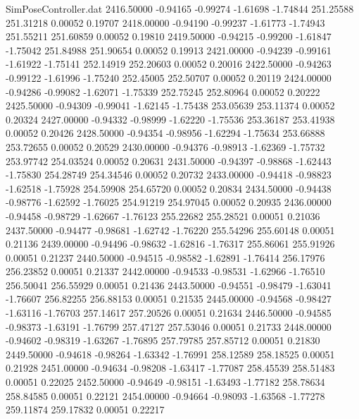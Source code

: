 \begin{filecontents}{SimPoseController.dat}
2416.50000   -0.94165   -0.99274    -1.61698   -1.74844  251.25588  251.31218    0.00052    0.19707
2418.00000   -0.94190   -0.99237    -1.61773   -1.74943  251.55211  251.60859    0.00052    0.19810
2419.50000   -0.94215   -0.99200    -1.61847   -1.75042  251.84988  251.90654    0.00052    0.19913
2421.00000   -0.94239   -0.99161    -1.61922   -1.75141  252.14919  252.20603    0.00052    0.20016
2422.50000   -0.94263   -0.99122    -1.61996   -1.75240  252.45005  252.50707    0.00052    0.20119
2424.00000   -0.94286   -0.99082    -1.62071   -1.75339  252.75245  252.80964    0.00052    0.20222
2425.50000   -0.94309   -0.99041    -1.62145   -1.75438  253.05639  253.11374    0.00052    0.20324
2427.00000   -0.94332   -0.98999    -1.62220   -1.75536  253.36187  253.41938    0.00052    0.20426
2428.50000   -0.94354   -0.98956    -1.62294   -1.75634  253.66888  253.72655    0.00052    0.20529
2430.00000   -0.94376   -0.98913    -1.62369   -1.75732  253.97742  254.03524    0.00052    0.20631
2431.50000   -0.94397   -0.98868    -1.62443   -1.75830  254.28749  254.34546    0.00052    0.20732
2433.00000   -0.94418   -0.98823    -1.62518   -1.75928  254.59908  254.65720    0.00052    0.20834
2434.50000   -0.94438   -0.98776    -1.62592   -1.76025  254.91219  254.97045    0.00052    0.20935
2436.00000   -0.94458   -0.98729    -1.62667   -1.76123  255.22682  255.28521    0.00051    0.21036
2437.50000   -0.94477   -0.98681    -1.62742   -1.76220  255.54296  255.60148    0.00051    0.21136
2439.00000   -0.94496   -0.98632    -1.62816   -1.76317  255.86061  255.91926    0.00051    0.21237
2440.50000   -0.94515   -0.98582    -1.62891   -1.76414  256.17976  256.23852    0.00051    0.21337
2442.00000   -0.94533   -0.98531    -1.62966   -1.76510  256.50041  256.55929    0.00051    0.21436
2443.50000   -0.94551   -0.98479    -1.63041   -1.76607  256.82255  256.88153    0.00051    0.21535
2445.00000   -0.94568   -0.98427    -1.63116   -1.76703  257.14617  257.20526    0.00051    0.21634
2446.50000   -0.94585   -0.98373    -1.63191   -1.76799  257.47127  257.53046    0.00051    0.21733
2448.00000   -0.94602   -0.98319    -1.63267   -1.76895  257.79785  257.85712    0.00051    0.21830
2449.50000   -0.94618   -0.98264    -1.63342   -1.76991  258.12589  258.18525    0.00051    0.21928
2451.00000   -0.94634   -0.98208    -1.63417   -1.77087  258.45539  258.51483    0.00051    0.22025
2452.50000   -0.94649   -0.98151    -1.63493   -1.77182  258.78634  258.84585    0.00051    0.22121
2454.00000   -0.94664   -0.98093    -1.63568   -1.77278  259.11874  259.17832    0.00051    0.22217

\end{filecontents}
